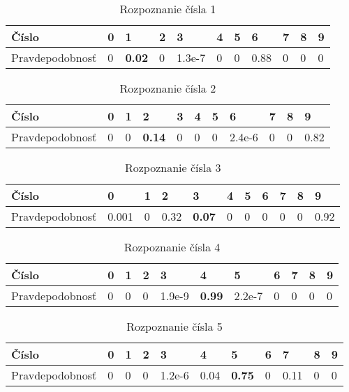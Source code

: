 \begin{table}[H]
  \begin{tabular}{ | l | l | l | l | l | l | l | l | l | l | l |}
    \hline
    Číslo & 0 & 1 & 2 & 3 & 4 & 5 & 6 & 7 & 8 & 9 \\ \hline
    Pravdepodobnosť & 0 & \textbf{0.02} & 0 & 1.3e-7 & 0 & 0 & 0.88 & 0 & 0 & 0 \\
    \hline
  \end{tabular}
  \caption[Rozpoznanie čísla 1]{Rozpoznanie čísla 1}
\end{table}

\begin{table}[H]
  \begin{tabular}{ | l | l | l | l | l | l | l | l | l | l | l |}
    \hline
    Číslo & 0 & 1 & 2 & 3 & 4 & 5 & 6 & 7 & 8 & 9 \\ \hline
    Pravdepodobnosť & 0 & 0 & \textbf{0.14} & 0 & 0 & 0 & 2.4e-6 & 0 & 0 & 0.82 \\
    \hline
  \end{tabular}
  \caption[Rozpoznanie čísla 2]{Rozpoznanie čísla 2}
\end{table}

\begin{table}[H]
  \begin{tabular}{ | l | l | l | l | l | l | l | l | l | l | l |}
    \hline
    Číslo & 0 & 1 & 2 & 3 & 4 & 5 & 6 & 7 & 8 & 9 \\ \hline
    Pravdepodobnosť & 0.001 & 0 & 0.32 & \textbf{0.07} & 0 & 0 & 0 & 0 & 0 & 0.92 \\
    \hline
  \end{tabular}
  \caption[Rozpoznanie čísla 3]{Rozpoznanie čísla 3}
\end{table}

\begin{table}[H]
  \begin{tabular}{ | l | l | l | l | l | l | l | l | l | l | l |}
    \hline
    Číslo & 0 & 1 & 2 & 3 & 4 & 5 & 6 & 7 & 8 & 9 \\ \hline
    Pravdepodobnosť & 0 & 0 & 0 & 1.9e-9 & \textbf{0.99} & 2.2e-7 & 0 & 0 & 0 & 0 \\
    \hline
  \end{tabular}
  \caption[Rozpoznanie čísla 4]{Rozpoznanie čísla 4}
\end{table}

\begin{table}[H]
  \begin{tabular}{ | l | l | l | l | l | l | l | l | l | l | l |}
    \hline
    Číslo & 0 & 1 & 2 & 3 & 4 & 5 & 6 & 7 & 8 & 9 \\ \hline
    Pravdepodobnosť & 0 & 0 & 0 & 1.2e-6 & 0.04 & \textbf{0.75} & 0 & 0.11 & 0 & 0 \\
    \hline
  \end{tabular}
  \caption[Rozpoznanie čísla 5]{Rozpoznanie čísla 5}
\end{table}

